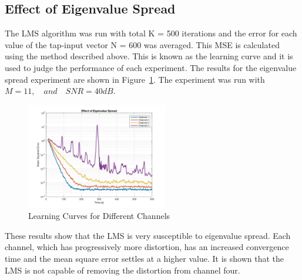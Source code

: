 \documentclass[journal]{IEEEtran}
\begin{document}
\subsection{Effect of Eigenvalue Spread}
The LMS algorithm was run with total K = 500 iterations and the error for each value of the tap-input vector N = 600 was averaged.
This MSE is calculated using the method described above. This is known as the learning curve and it is used to judge the
performance of each experiment. The results for the eigenvalue spread experiment are shown in Figure~\ref{fig:eigenspread}.
The experiment was run with $M = 11, \quad and \quad SNR = 40dB$.

\begin{figure}[H]
  \centering
  \captionsetup{justification=centering,font = small}
  \includegraphics[width=0.55\textwidth, right] {Plots/Project1_Part1_2.jpg}
  \caption{Learning Curves for Different Channels}
    \label{fig:eigenspread}
\end{figure}
These results show that the LMS is very susceptible to eigenvalue spread. Each channel,
which has progressively more distortion, has an increased convergence time and the mean square
error settles at a higher value. It is shown that the LMS is not capable of
removing the distortion from channel four.
\end{document}
